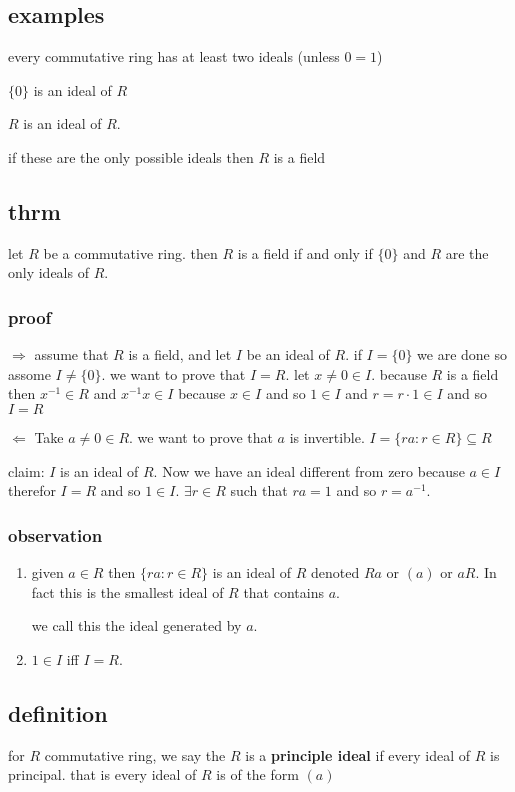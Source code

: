 \documentclass[letterpaper]{article}
\begin{document}
\subsection*{examples}
every commutative ring has at least two ideals (unless $0=1$)

$\{0\}$ is an ideal of $R$

$R$ is an ideal of $R$.

if these are the only possible ideals then $R$ is a field

\subsection*{thrm}
let $R$ be a commutative ring. then $R$ is a field if and only if $\{0\}$ and $R$ are the only ideals of $R$.

\subsubsection*{proof}
$\Rightarrow$ assume that $R$ is a field, and let $I$ be an ideal of $R$. if $I=\{0\}$ we are done so assome $I\ne \{0\}$. we want to prove that $I=R$. let $x\ne0\in I$. because $R$ is a field then $x^{-1}\in R$ and $x^{-1}x\in I$ because $x\in I$ and so $1\in I$ and $r=r\cdot 1\in I$ and so $I=R$

$\Leftarrow$
Take $a\ne 0\in R$. we want to prove that $a$ is invertible.
$I=\{ra:r\in R\}\subseteq R$

claim: $I$ is an ideal of $R$. Now we have an ideal different from zero because $a\in I$ therefor $I=R$ and so $1\in I$. $\exists r\in R$ such that $ra=1$ and so $r=a^{-1}$.

\subsubsection*{observation}
\begin{enumerate}
\item
given $a\in R$ then $\{ra:r\in R\}$ is an ideal of $R$ denoted $Ra$ or $(a)$ or $aR$. In fact this is the smallest ideal of $R$ that contains $a$.

we call this the ideal generated by $a$.
\item
$1\in I$ iff $I=R$.
\end{enumerate}
\subsection*{definition}
for $R$ commutative ring, we say the $R$ is a {\bfseries principle ideal} if every ideal of $R$ is principal. that is every  ideal of $R$ is of the form $(a)$
\end{document}
